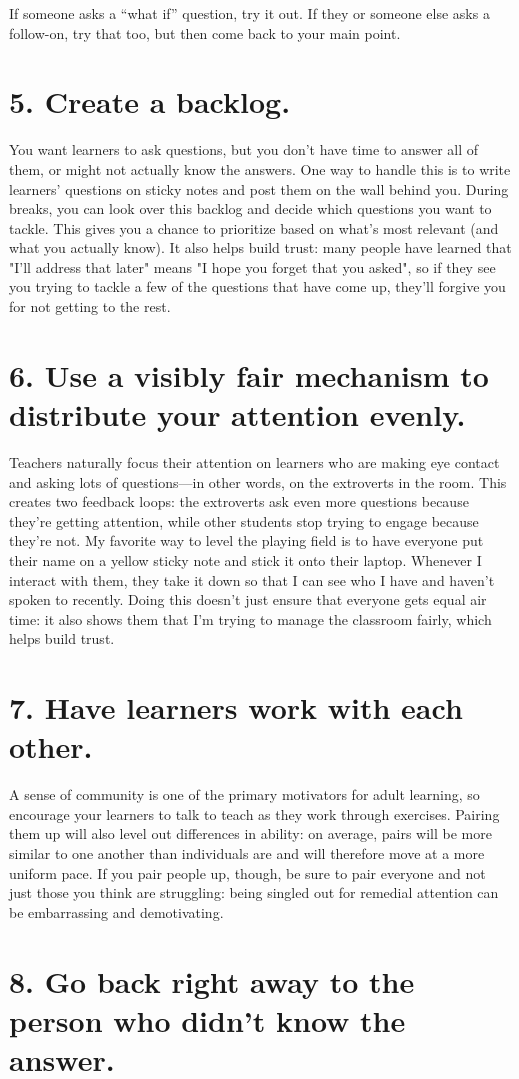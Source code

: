 \documentclass[10pt,letterpaper]{article}
\newcommand{\rulemajor}[1]{\section{#1}}
\begin{document}
If someone asks a ``what if'' question, try it out.
If they or someone else asks a follow-on, try that too, but then come back to your main point.

\rulemajor{5. Create a backlog.}

You want learners to ask questions, but you don't have time to answer all of them,
or might not actually know the answers.
One way to handle this is to write learners' questions on sticky notes and post them on the wall behind you.
During breaks,
you can look over this backlog and decide which questions you want to tackle.
This gives you a chance to prioritize based on what's most relevant (and what you actually know).
It also helps build trust:
many people have learned that "I'll address that later" means "I hope you forget that you asked",
so if they see you trying to tackle a few of the questions that have come up,
they'll forgive you for not getting to the rest.

\rulemajor{6. Use a visibly fair mechanism to distribute your attention evenly.}

Teachers naturally focus their attention on learners who are making eye contact and asking lots of questions---in other words,
on the extroverts in the room.
This creates two feedback loops:
the extroverts ask even more questions because they're getting attention,
while other students stop trying to engage because they're not.
My favorite way to level the playing field is to have everyone put their name on a yellow sticky note
and stick it onto their laptop.
Whenever I interact with them, they take it down
so that I can see who I have and haven't spoken to recently.
Doing this doesn't just ensure that everyone gets equal air time:
it also shows them that I'm trying to manage the classroom fairly,
which helps build trust.

\rulemajor{7. Have learners work with each other.}

A sense of community is one of the primary motivators for adult learning,
so encourage your learners to talk to teach as they work through exercises.
Pairing them up will also level out differences in ability:
on average, pairs will be more similar to one another than individuals are
and will therefore move at a more uniform pace.
If you pair people up, though, be sure to pair everyone and not just those you think are struggling:
being singled out for remedial attention can be embarrassing and demotivating.

\rulemajor{8. Go back right away to the person who didn't know the answer.}
\end{document}
